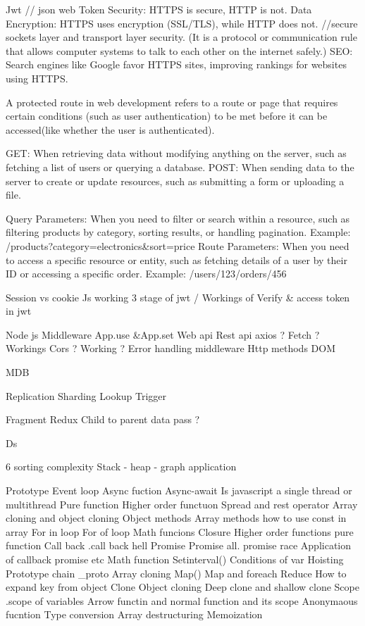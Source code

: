 
Jwt  // json web Token 
Security: HTTPS is secure, HTTP is not.
Data Encryption: HTTPS uses encryption (SSL/TLS), while HTTP does not. //secure sockets layer and transport layer security. 
(It is a protocol or communication rule that allows computer systems to talk to each other on the internet safely.)
SEO: Search engines like Google favor HTTPS sites, improving rankings for websites using HTTPS.

A protected route in web development refers to a route or page that requires certain conditions 
(such as user authentication) to be met before it can be accessed(like whether the user is authenticated).

GET: When retrieving data without modifying anything on the server, such as fetching a list of users or querying a database.
POST: When sending data to the server to create or update resources, such as submitting a form or uploading a file.


Query Parameters: When you need to filter or search within a resource, such as filtering products by category, sorting results, or handling pagination.
Example: /products?category=electronics&sort=price
Route Parameters: When you need to access a specific resource or entity, such as fetching details of a user by their ID or accessing a specific order.
Example: /users/123/orders/456

Session vs cookie
Js working
3 stage of jwt /
Workings of Verify & access token in jwt 


Node js
Middleware
App.use &App.set
Web api
Rest api
axios ? Fetch ? Workings
Cors ? Working ?
Error handling middleware
Http methods
DOM 

MDB

Replication
Sharding
Lookup
Trigger



Fragment
Redux
Child to parent data pass ?


Ds 

6 sorting complexity 
Stack - heap - graph application

Prototype
Event loop
Async fuction
Async-await
Is javascript a single thread or multithread
Pure function
Higher order functuon
Spread and rest operator
Array cloning  and object cloning
Object methods
Array methods
 how to use const in array
For in loop
For of loop
Math funcions
Closure
Higher order functions pure function
Call back
.call back hell
Promise
Promise all.
promise race
Application of callback promise etc
Math function
Setinterval()
Conditions of var
Hoisting
Prototype chain
_proto
Array cloning
Map()
Map and foreach
Reduce
How to expand key from object
Clone
Object cloning
Deep clone and shallow clone
Scope
.scope of variables
Arrow functin and normal function and its scope
Anonymaous fucntion
Type conversion
Array destructuring
Memoization

